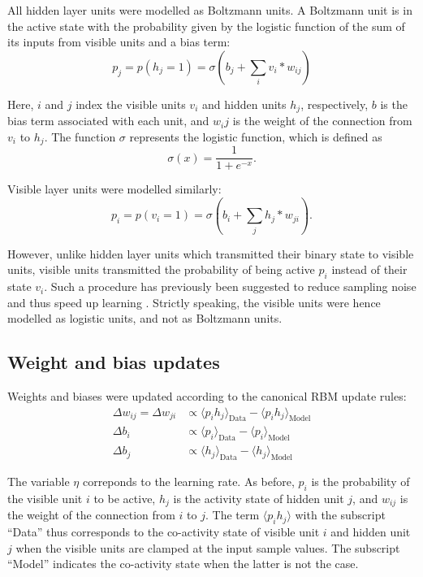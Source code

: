 \documentclass[11pt]{article}
\begin{document}
All hidden layer units were modelled as Boltzmann units. A Boltzmann
unit is in the active state with the probability given by the logistic
function of the sum of its inputs from visible units and a bias term:
\begin{equation}
  p_j = p(h_j = 1) = \sigma(b_j + \sum_i v_i * w_{ij})
\end{equation}

Here, $i$ and $j$ index the visible units $v_i$ and hidden units $h_j$,
respectively, $b$ is the bias term associated with each unit, and
$w_ij$ is the weight of the connection from $v_i$ to $h_j$. The function
$\sigma$ represents the logistic function, which is defined as
\begin{equation}
  \sigma(x) = \frac{1}{1 + e^{-x}}.
\end{equation}

Visible layer units were modelled similarly:
\begin{equation}
  p_i = p(v_i = 1) = \sigma(b_i + \sum_j h_j * w_{ji}).
\end{equation}

However, unlike hidden layer units which transmitted their binary
state to visible units, visible units transmitted the probability of
being active $p_i$ instead of their state $v_i$. Such a procedure has
previously been suggested to reduce sampling noise and thus speed up
learning \citep{Hinton2012}. Strictly speaking, the visible units were
hence modelled as logistic units, and not as Boltzmann units.

\subsection{Weight and bias updates}

Weights and biases were updated according to the canonical RBM update rules:
\begin{align}
  \label{eq:rbm_update_equations}
  \Delta w_{ij} = \Delta w_{ji} &\propto \langle p_{i}h_{j} \rangle_{\text{Data}} - \langle p_{i}h_{j} \rangle_{\text{Model}} \\
  \Delta b_{i}                  &\propto \langle p_{i}      \rangle_{\text{Data}} - \langle p_{i}      \rangle_{\text{Model}} \\
  \Delta b_{j}                  &\propto \langle h_{j}      \rangle_{\text{Data}} - \langle h_{j}      \rangle_{\text{Model}}
\end{align}

The variable $\eta$ correponds to the learning rate. As before, $p_i$
is the probability of the visible unit $i$ to be active, $h_j$ is the
activity state of hidden unit $j$, and $w_{ij}$ is the weight of the
connection from $i$ to $j$. The term $\langle p_{i}h_{j} \rangle$ with
the subscript ``Data'' thus corresponds to the co-activity state of
visible unit $i$ and hidden unit $j$ when the visible units are
clamped at the input sample values. The subscript ``Model'' indicates
the co-activity state when the latter is not the case.
\end{document}
